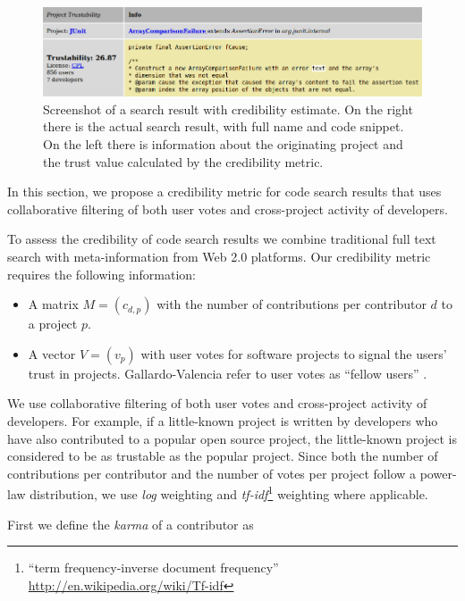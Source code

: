\begin{figure}
  \centering
  	 \includegraphics[width=\linewidth]{fig/bender-screenshot}
    \caption{
    {\small
    Screenshot of a \Jbd search result with credibility estimate. On the right there is the actual search result, with full name and code snippet. On the left there is information about the originating project and the trust value calculated by the credibility metric.
    }
    }
    \label{fig:screenshot}
\end{figure}

In this section, we propose a credibility metric for code search results that uses collaborative filtering of both user votes and cross-project activity of developers.

To assess the credibility of code search results we combine traditional full text search with meta-information from Web 2.0 platforms. Our credibility metric requires the following information:

\begin{itemize}
\item A matrix $M = (c_{d,p})$ with the number of contributions per contributor $d$ to a project $p$.
\item A vector $V = (v_p)$ with user votes for software projects to signal the users' trust in projects. Gallardo-Valencia \etal refer to user votes as ``fellow users'' \cite{Gall09a}.
\end{itemize}

We use collaborative filtering of both user votes and cross-project activity of developers. For example, if a little-known project is written by developers who have also contributed to a popular open source project, the little-known project is considered to be as trustable as the popular project. Since both the number of contributions per contributor and the number of votes per project follow a power-law distribution, we use \emph{log} weighting and \emph{tf-idf}\footnote{``term frequency-inverse document frequency'' \url{http://en.wikipedia.org/wiki/Tf-idf}} weighting where applicable. 

First we define the \emph{karma} of a contributor as

